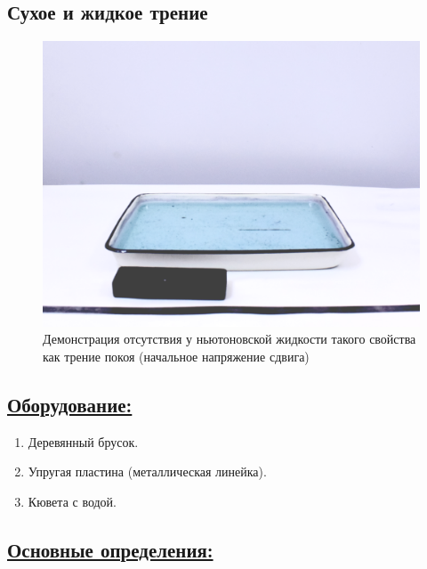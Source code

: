 \documentclass[14pt,a4paper,oneside]{extarticle}	%
\begin{document}

	
\begin{center}
		\subsection*{Сухое и жидкое трение}
\end{center}
	
	\begin{figure}[H] 	%
		\centering 	
		\includegraphics[width=0.75\linewidth]{friction-1.png}
		\caption{Демонстрация отсутствия у ньютоновской жидкости такого свойства как трение покоя (начальное напряжение сдвига)}
		\label{friction-1}
	\end{figure}
	
	\subsection*{\underline{Оборудование:}}
	
	\begin{enumerate} 
		\item Деревянный брусок.
		\item Упругая пластина (металлическая линейка).
		\item Кювета с водой.
		
	\end{enumerate}

	\subsection*{\underline{Основные определения:}}
	
\end{document}

